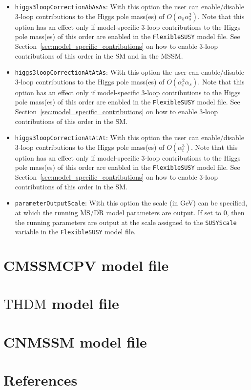 \documentclass[final,3p,11pt,pdflatex]{elsarticle}
\makeatletter
\newcommand{\fs}{\texttt{FlexibleSUSY}\@\xspace}
\newcommand{\code}[1]{\lstinline|#1|}  %
\newcommand{\ol}[1]{\overline{#1}}
\newcommand{\MSbar}{\ensuremath{\ol{\text{MS}}}\xspace}
\newcommand{\DRbar}{\ensuremath{\ol{\text{DR}}}\xspace}
\newcommand{\THDM}{\ensuremath{\text{THDM}}\xspace}
\newcommand{\secref}[1]{Section~\ref{#1}}
\def\at{\alpha_t}
\def\ab{\alpha_b}
\def\as{\alpha_s}
\makeatother
\begin{document}
\begin{itemize}
\item[\texttt{FlexibleSUSY[27]},] \texttt{higgs3loopCorrectionAbAsAs}:
  With this option the user can enable/disable 3-loop contributions to
  the Higgs pole mass(es) of $O(\ab\as^2)$.  Note that this option
  has an effect only if model-specific 3-loop contributions to the
  Higgs pole mass(es) of this order are enabled in the \fs model file.
  See \secref{sec:model_specific_contributions} on how to enable
  3-loop contributions of this order in the SM and in the
  MSSM\@.

\item[\texttt{FlexibleSUSY[28]},] \texttt{higgs3loopCorrectionAtAtAs}:
  With this option the user can enable/disable 3-loop contributions to
  the Higgs pole mass(es) of $O(\at^2\as)$.  Note that this option
  has an effect only if model-specific 3-loop contributions to the
  Higgs pole mass(es) of this order are enabled in the \fs model file.
  See \secref{sec:model_specific_contributions} on how to enable
  3-loop contributions of this order in the SM\@.

\item[\texttt{FlexibleSUSY[29]},] \texttt{higgs3loopCorrectionAtAtAt}:
  With this option the user can enable/disable 3-loop contributions to
  the Higgs pole mass(es) of $O(\at^3)$.  Note that this option has
  an effect only if model-specific 3-loop contributions to the Higgs
  pole mass(es) of this order are enabled in the \fs model file.  See
  \secref{sec:model_specific_contributions} on how to enable 3-loop
  contributions of this order in the SM\@.

\item[\texttt{MODSEL[12]},] \texttt{parameterOutputScale}: With this
  option the scale (in GeV) can be specified, at which the running
  \MSbar/\DRbar model parameters are output.  If set to $0$, then the
  running parameters are output at the scale assigned to the
  \code{SUSYScale} variable in the \fs model file.
\end{itemize}

\section{CMSSMCPV model file}
\label{app:CMSSMCPV}


\section{\THDM model file}
\label{app:THDMIIMSSMBC}


\section{CNMSSM model file}
\label{app:CNMSSM}


\clearpage

\section*{References}



\end{document}

